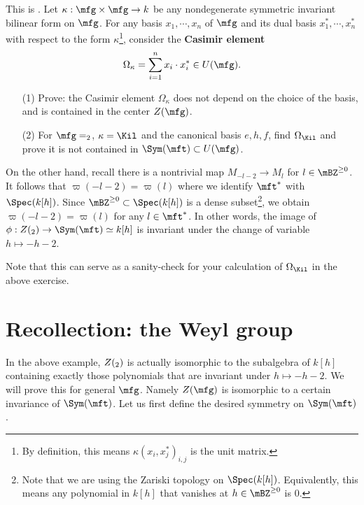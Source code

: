 \begin{exe}
	This is . Let $\kappa:\mfg\times\mfg \to k$ be any nondegenerate symmetric invariant bilinear form on $\mfg$. For any basis $x_1,\cdots,x_n$ of $\mfg$ and its dual basis $x_1^*,\cdots,x_n^*$ with respect to the form $\kappa$\footnote{By definition, this means $\kappa(x_i,x_j^*)_{i,j}$ is the unit matrix.}, consider the \textbf{Casimir element}
	\[
		\Omega_\kappa = \sum_{i=1}^n x_i \cdot x_i^* \in U(\mfg).
	\]
	\begin{itemize}
		\item[(1)]
			Prove: the Casimir element $\Omega_\kappa$ does not depend on the choice of the basis, and is contained in the center $Z(\mfg)$.
		\item[(2)]
			For $\mfg=\sl_2$, $\kappa=\Kil$ and the canonical basis $e,h,f$, find $\Omega_\Kil$ and prove it is not contained in $\Sym(\mft) \subset U(\mfg)$.
	\end{itemize}
\end{exe}

\begin{exam}
	\label{exam-rho-shift}
	On the other hand, recall there is a nontrivial map $M_{-l-2} \to M_l$ for $l\in \mBZ^{\ge 0}$. It follows that $\varpi(-l-2)=\varpi(l)$ where we identify $\mft^*$ with $\Spec(k[h])$. Since $ \mBZ^{\ge 0} \subset \Spec(k[h])$ is a dense subset\footnote{Note that we are using the Zariski topology on $\Spec(k[h])$. Equivalently, this means any polynomial in $k[h]$ that vanishes at $h\in \mBZ^{\ge 0}$ is $0$.}, we obtain $\varpi(-l-2)=\varpi(l)$ for any $l\in \mft^*$. In other words, the image of $\phi:Z(\sl_2) \to \Sym(\mft)\simeq k[h]$ is invariant under the change of variable $h\mapsto -h-2$.

	Note that this can serve as a sanity-check for your calculation of $\Omega_\Kil$ in the above exercise.
\end{exam}

\section{Recollection: the Weyl group}

In the above example, $Z(\sl_2)$ is actually isomorphic to the subalgebra of $k[h]$ containing exactly those polynomials that are invariant under $h\mapsto -h-2$. We will prove this for general $\mfg$. Namely $Z(\mfg)$ is isomorphic to a certain invariance of $\Sym(\mft)$. Let us first define the desired symmetry on $\Sym(\mft)$.

